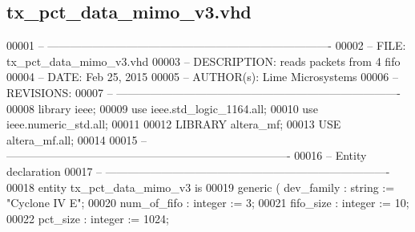 \subsection{tx\+\_\+pct\+\_\+data\+\_\+mimo\+\_\+v3.\+vhd}
\label{tx__pct__data__mimo__v3_8vhd_source}

\begin{DoxyCode}
00001 \textcolor{keyword}{-- ---------------------------------------------------------------------------- }
00002 \textcolor{keyword}{-- FILE:    tx\_pct\_data\_mimo\_v3.vhd}
00003 \textcolor{keyword}{-- DESCRIPTION: reads packets from 4 fifo}
00004 \textcolor{keyword}{-- DATE:    Feb 25, 2015}
00005 \textcolor{keyword}{-- AUTHOR(s):   Lime Microsystems}
00006 \textcolor{keyword}{-- REVISIONS:}
00007 \textcolor{keyword}{-- ---------------------------------------------------------------------------- }
00008 \textcolor{vhdlkeyword}{library }\textcolor{keywordflow}{ieee};
00009 \textcolor{vhdlkeyword}{use }ieee.std\_logic\_1164.\textcolor{keywordflow}{all};
00010 \textcolor{vhdlkeyword}{use }ieee.numeric\_std.\textcolor{keywordflow}{all};
00011 
00012 \textcolor{vhdlkeyword}{LIBRARY }\textcolor{keywordflow}{altera\_mf};
00013 \textcolor{vhdlkeyword}{USE }\textcolor{keywordflow}{altera\_mf.all};
00014 
00015 \textcolor{keyword}{-- ----------------------------------------------------------------------------}
00016 \textcolor{keyword}{-- Entity declaration}
00017 \textcolor{keyword}{-- ----------------------------------------------------------------------------}
00018 \textcolor{keywordflow}{entity }tx_pct_data_mimo_v3 \textcolor{keywordflow}{is}
00019   \textcolor{keywordflow}{generic} \textcolor{vhdlchar}{(} \textcolor{vhdlchar}{dev_family}  \textcolor{vhdlchar}{:} \textcolor{comment}{string}  \textcolor{vhdlchar}{:=} \textcolor{keyword}{"Cyclone IV E"};
00020                 \textcolor{vhdlchar}{num_of_fifo} \textcolor{vhdlchar}{:} \textcolor{comment}{integer} \textcolor{vhdlchar}{:=} \textcolor{vhdllogic}{}\textcolor{vhdllogic}{3};
00021             \textcolor{vhdlchar}{fifo_size}   \textcolor{vhdlchar}{:} \textcolor{comment}{integer} \textcolor{vhdlchar}{:=} \textcolor{vhdllogic}{}\textcolor{vhdllogic}{10};
00022             \textcolor{vhdlchar}{pct_size}    \textcolor{vhdlchar}{:} \textcolor{comment}{integer} \textcolor{vhdlchar}{:=} \textcolor{vhdllogic}{}\textcolor{vhdllogic}{1024};

\end{DoxyCode}

